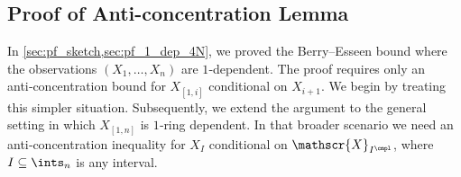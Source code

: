 \documentclass[aos]{imsart}
\begin{document}
\begin{appendix}
\subsection{Proof of Anti-concentration Lemma} \label{sec:pf_anti_concentration}

%
%

In \cref{sec:pf_sketch,sec:pf_1_dep_4N}, we proved the Berry--Esseen bound where the observations $(X_1, \dots, X_n)$ are $1$‑dependent. The proof requires only an anti‑concentration bound for $X_{[1,i]}$ conditional on $X_{i+1}$.
We begin by treating this simpler situation.  
Subsequently, we extend the argument to the general setting in which $X_{[1,n]}$ is $1$‑ring dependent. In that broader scenario we need an anti‑concentration inequality for $X_I$ conditional on $\mathscr{X}_{I^{\cmpl}}$, where $I\subseteq\ints_n$ is any interval.


\end{appendix}
\end{document}
